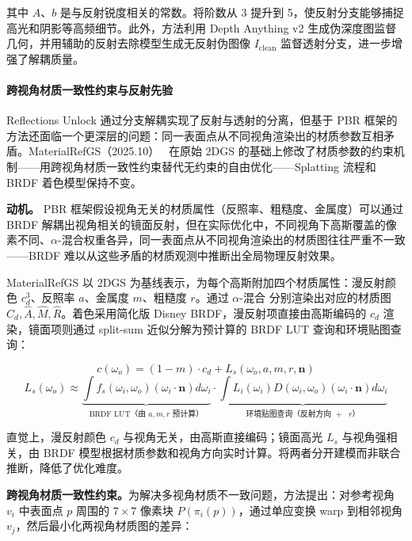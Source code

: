 其中 $A$、$b$ 是与反射锐度相关的常数。将阶数从 3 提升到 5，使反射分支能够捕捉高光和阴影等高频细节。此外，方法利用 Depth Anything v2 生成伪深度图监督几何，并用辅助的反射去除模型生成无反射伪图像 $I_{\text{clean}}$ 监督透射分支，进一步增强了解耦质量。

\paragraph{跨视角材质一致性约束与反射先验}

Reflections Unlock 通过分支解耦实现了反射与透射的分离，但基于 PBR 框架的方法还面临一个更深层的问题：同一表面点从不同视角渲染出的材质参数互相矛盾。MaterialRefGS（2025.10）~\cite{2510_11387} 在原始 2DGS 的基础上修改了材质参数的约束机制——用跨视角材质一致性约束替代无约束的自由优化——Splatting 流程和 BRDF 着色模型保持不变。

\textbf{动机。} PBR 框架假设视角无关的材质属性（反照率、粗糙度、金属度）可以通过 BRDF 解耦出视角相关的镜面反射，但在实际优化中，不同视角下高斯覆盖的像素不同、$\alpha$-混合权重各异，同一表面点从不同视角渲染出的材质图往往严重不一致——BRDF 难以从这些矛盾的材质观测中推断出全局物理反射效果。

MaterialRefGS 以 2DGS 为基线表示，为每个高斯附加四个材质属性：漫反射颜色 $c_d^3$、反照率 $a$、金属度 $m$、粗糙度 $r$。通过 $\alpha$-混合 分别渲染出对应的材质图 $\hat{C}_d, \hat{A}, \hat{M}, \hat{R}$。着色采用简化版 Disney BRDF，漫反射项直接由高斯编码的 $c_d$ 渲染，镜面项则通过 split-sum 近似分解为预计算的 BRDF LUT 查询和环境贴图查询：

\begin{equation}
c(\omega_o) = (1 - m) \cdot c_d + L_s(\omega_o, a, m, r, \mathbf{n})
\end{equation}
\begin{equation}
L_s(\omega_o) \approx \underbrace{\int f_s(\omega_i, \omega_o)(\omega_i \cdot \mathbf{n}) d\omega_i}_{\text{BRDF LUT（由 $a, m, r$ 预计算）}} \cdot \underbrace{\int L_i(\omega_i) D(\omega_i, \omega_o)(\omega_i \cdot \mathbf{n}) d\omega_i}_{\text{环境贴图查询（反射方向 $+$ $r$）}}
\end{equation}

直觉上，漫反射颜色 $c_d$ 与视角无关，由高斯直接编码；镜面高光 $L_s$ 与视角强相关，由 BRDF 模型根据材质参数和视角方向实时计算。将两者分开建模而非联合推断，降低了优化难度。

\textbf{跨视角材质一致性约束。}为解决多视角材质不一致问题，方法提出：对参考视角 $v_i$ 中表面点 $p$ 周围的 $7 \times 7$ 像素块 $P(\pi_i(p))$，通过单应变换 warp 到相邻视角 $v_j$，然后最小化两视角材质图的差异：


